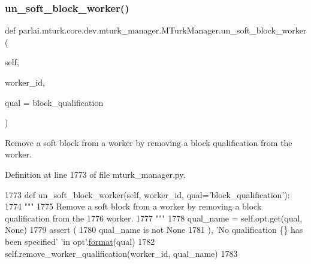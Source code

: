 \subsubsection{\texorpdfstring{un\+\_\+soft\+\_\+block\+\_\+worker()}{un\_soft\_block\_worker()}}
{\footnotesize\ttfamily def parlai.\+mturk.\+core.\+dev.\+mturk\+\_\+manager.\+M\+Turk\+Manager.\+un\+\_\+soft\+\_\+block\+\_\+worker (\begin{DoxyParamCaption}\item[{}]{self,  }\item[{}]{worker\+\_\+id,  }\item[{}]{qual = {\ttfamily \textquotesingle{}block\+\_\+qualification\textquotesingle{}} }\end{DoxyParamCaption})}

\begin{DoxyVerb}Remove a soft block from a worker by removing a block qualification from the
worker.
\end{DoxyVerb}
 

Definition at line 1773 of file mturk\+\_\+manager.\+py.


\begin{DoxyCode}
1773     \textcolor{keyword}{def }un\_soft\_block\_worker(self, worker\_id, qual='block\_qualification'):
1774         \textcolor{stringliteral}{"""}
1775 \textcolor{stringliteral}{        Remove a soft block from a worker by removing a block qualification from the}
1776 \textcolor{stringliteral}{        worker.}
1777 \textcolor{stringliteral}{        """}
1778         qual\_name = self.opt.get(qual, \textcolor{keywordtype}{None})
1779         \textcolor{keyword}{assert} (
1780             qual\_name \textcolor{keywordflow}{is} \textcolor{keywordflow}{not} \textcolor{keywordtype}{None}
1781         ), \textcolor{stringliteral}{'No qualification \{\} has been specified'} \textcolor{stringliteral}{'in opt'}.\hyperlink{namespaceparlai_1_1chat__service_1_1services_1_1messenger_1_1shared__utils_a32e2e2022b824fbaf80c747160b52a76}{format}(qual)
1782         self.remove\_worker\_qualification(worker\_id, qual\_name)
1783 
\end{DoxyCode}
\mbox{\label{classparlai_1_1mturk_1_1core_1_1dev_1_1mturk__manager_1_1MTurkManager_a1dcb973dba5c4261e8f9d7ba004ae2f2}} 
